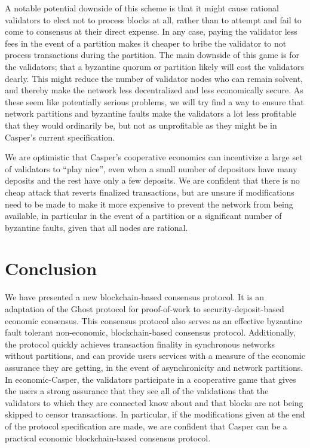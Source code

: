 \documentclass[11pt,a4paper]{article}
\begin{document}
A notable potential downside of this scheme is that it might cause rational validators to elect not to process blocks at all, rather than to attempt and fail to come to consensus at their direct expense. In any case, paying the validator less fees in the event of a partition makes it cheaper to bribe the validator to not process transactions during the partition. The main downside of this game is for the validators; that a byzantine quorum or partition likely will cost the validators dearly. This might reduce the number of validator nodes who can remain solvent, and thereby make the network less decentralized and less economically secure. As these seem like potentially serious problems, we will try find a way to ensure that network partitions and byzantine faults make the validators a lot less profitable that they would ordinarily be, but not as unprofitable as they might be in Casper's current specification. 

We are optimistic that Casper's cooperative economics can incentivize a large set of validators to ``play nice'', even when a small number of depositors have many deposits and the rest have only a few deposits. We are confident that there is no cheap attack that reverts finalized transactions, but are unsure if modifications need to be made to make it more expensive to prevent the network from being available, in particular in the event of a partition or a significant number of byzantine faults, given that all nodes are rational.

\section{Conclusion}

We have presented a new blockchain-based consensus protocol. It is an adaptation of the Ghost protocol for proof-of-work to security-deposit-based economic consensus. This consensus protocol also serves as an effective byzantine fault tolerant non-economic, blockchain-based consensus protocol. Additionally, the protocol quickly achieves transaction finality in synchronous networks without partitions, and can provide users services with a measure of the economic assurance they are getting, in the event of asynchronicity and network partitions. In economic-Casper, the validators participate in a cooperative game that gives the users a strong assurance that they see all of the validations that the validators to which they are connected know about and that blocks are not being skipped to censor transactions. In particular, if the modifications given at the end of the protocol specification are made, we are confident that Casper can be a practical economic blockchain-based consensus protocol.



\end{document}
